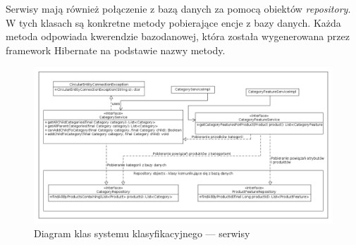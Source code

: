 Serwisy mają również połączenie z bazą danych za pomocą obiektów \textit{repository}. W tych klasach są konkretne metody pobierające encje z bazy danych. Każda metoda odpowiada kwerendzie bazodanowej, która została wygenerowana przez framework Hibernate na podstawie nazwy metody. 
\begin{figure}
	\begin{center}
		\includegraphics[scale=0.38]{klasy_serwisy_sysKlas.png}
	\end{center}
	\caption{{\color{black}Diagram klas systemu klasyfikacyjnego — serwisy}} \label{klasy_serwisy_sysKlas}
\end{figure}

